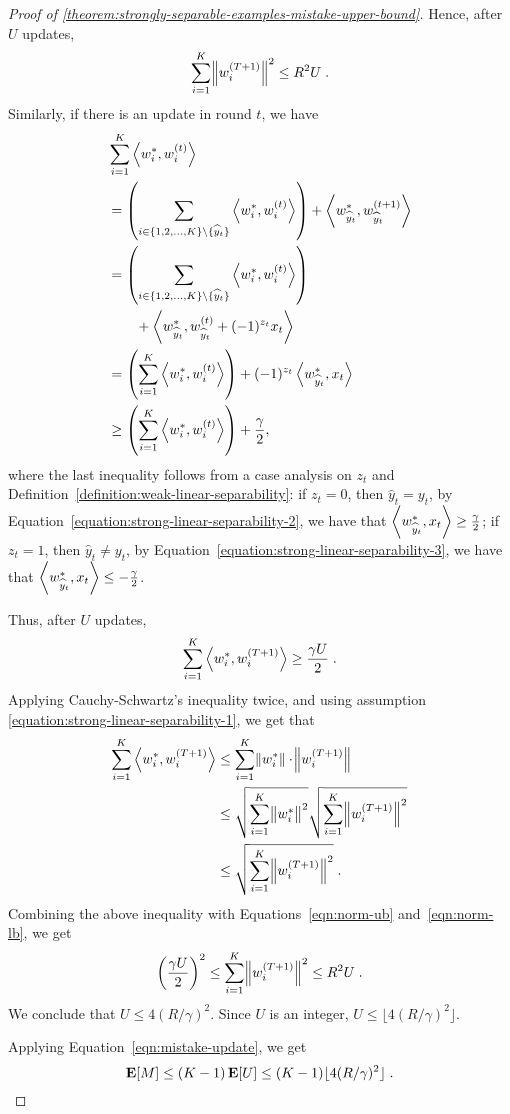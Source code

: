 \begin{proof}[Proof of \autoref{theorem:strongly-separable-examples-mistake-upper-bound}]
Hence, after $U$ updates,
\begin{equation}
\sum_{i=1}^K \norm{w_i^{(T+1)}}^2 \le R^2 U \; .
\label{eqn:norm-ub}
\end{equation}
Similarly, if there is an update in round $t$, we have
\begingroup
\allowdisplaybreaks
\begin{align*}
& \sum_{i=1}^K \left\langle w_i^*, w_i^{(t)} \right\rangle \\
& = \left( \sum_{i \in \{1,2,\dots,K\} \setminus \{\widehat y_t\}} \left\langle w_i^*, w_i^{(t)} \right\rangle \right) + \left\langle w_{\widehat y_t}^*, w_{\widehat y_t}^{(t+1)} \right\rangle \\
& = \left( \sum_{i \in \{1,2,\dots,K\} \setminus \{\widehat y_t\}} \left\langle w_i^*, w_i^{(t)} \right\rangle \right) \\
& \qquad + \left\langle w_{\widehat y_t}^*, w_{\widehat y_t}^{(t)} + (-1)^{z_t} x_t \right\rangle \\
& = \left( \sum_{i=1}^K \left\langle w_i^*, w_i^{(t)} \right\rangle \right) + (-1)^{z_t} \left\langle w_{\widehat y_t}^*, x_t \right\rangle \\
& \ge \left( \sum_{i=1}^K \left\langle w_i^*, w_i^{(t)} \right\rangle \right) + \frac \gamma 2,
\end{align*}
\endgroup
where the last inequality follows from a case analysis on $z_t$ and
Definition~\ref{definition:weak-linear-separability}: if $z_t = 0$, then
$\widehat y_t = y_t$, by Equation~\eqref{equation:strong-linear-separability-2},
we have that $\left\langle w_{\widehat y_t}^*, x_t \right\rangle \geq \frac \gamma 2$; if $z_t = 1$,
then $\widehat y_t \neq y_t$, by
Equation~\eqref{equation:strong-linear-separability-3}, we have that
$\left\langle w_{\widehat y_t}^*, x_t \right\rangle \le -\frac \gamma 2$.

Thus, after $U$ updates,
\begin{equation}
\sum_{i=1}^K \left\langle w_i^*, w_i^{(T+1)} \right\rangle \ge \frac {\gamma U} 2 \; .
\label{eqn:norm-lb}
\end{equation}
Applying Cauchy-Schwartz's inequality twice, and using assumption
\eqref{equation:strong-linear-separability-1}, we get that
\begin{align*}
\sum_{i=1}^K \left\langle w_i^*, w_i^{(T+1)} \right\rangle
& \le \sum_{i=1}^K \norm{w_i^*} \cdot \norm{w_i^{(T+1)}} \\
& \le \sqrt{\sum_{i=1}^K \norm{w_i^*}^2} \sqrt{\sum_{i=1}^K \norm{w_i^{(T+1)}}^2} \\
& \le \sqrt{\sum_{i=1}^K \norm{w_i^{(T+1)}}^2} \; .
\end{align*}
Combining the above inequality with Equations~\eqref{eqn:norm-ub} and~\eqref{eqn:norm-lb}, we get
$$
\left(\frac{\gamma U}{2} \right)^2 \le \sum_{i=1}^K \norm{w_i^{(T+1)}}^2 \le R^2 U \; .
$$
We conclude that $U \le 4(R/\gamma)^2$. Since $U$ is an integer, $U \le \lfloor 4(R/\gamma)^2 \rfloor$.

Applying Equation~\eqref{eqn:mistake-update}, we get
$$
\operatorname*{\mathbf{E}}[M] \leq (K-1) \operatorname*{\mathbf{E}}[U] \leq (K-1) \lfloor 4(R/\gamma)^2 \rfloor \; . \qedhere
$$
\end{proof}




